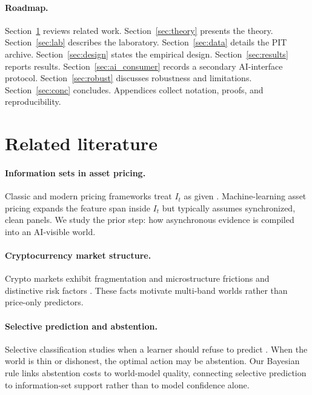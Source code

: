 \documentclass[12pt]{article}
\begin{document}
\paragraph{Roadmap.}
Section~\ref{sec:lit} reviews related work. Section~\ref{sec:theory} presents the theory. Section~\ref{sec:lab} describes the laboratory. Section~\ref{sec:data} details the PIT archive. Section~\ref{sec:design} states the empirical design. Section~\ref{sec:results} reports results. Section~\ref{sec:ai_consumer} records a secondary AI-interface protocol. Section~\ref{sec:robust} discusses robustness and limitations. Section~\ref{sec:conc} concludes. Appendices collect notation, proofs, and reproducibility.

\section{Related literature}
\label{sec:lit}

\paragraph{Information sets in asset pricing.}
Classic and modern pricing frameworks treat $I_t$ as given \citep{cochrane2005,fama1993}. Machine-learning asset pricing expands the feature span inside $I_t$ \citep{gu2020,kelly2019,nagel2021} but typically assumes synchronized, clean panels. We study the prior step: how asynchronous evidence is compiled into an AI-visible world.

\paragraph{Cryptocurrency market structure.}
Crypto markets exhibit fragmentation and microstructure frictions \citep{makarov2020} and distinctive risk factors \citep{liu2022}. These facts motivate multi-band worlds rather than price-only predictors.

\paragraph{Selective prediction and abstention.}
Selective classification studies when a learner should refuse to predict \citep{elyaniv2010,geifman2017}. When the world is thin or dishonest, the optimal action may be abstention. Our Bayesian rule links abstention costs to world-model quality, connecting selective prediction to information-set support rather than to model confidence alone.
\end{document}
